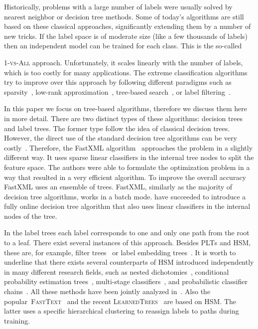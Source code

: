 \documentclass{article}
\newcommand{\Algo}[1]{\textsc{#1}}
\begin{document}
Historically, problems with a large number of labels were usually solved by nearest neighbor or decision tree methods. Some of today's algorithms are still based on these classical approaches, significantly extending them by a number of new tricks. If the label space is of moderate size (like a few thousands of labels) then an independent model can be trained for each class. This is the so-called {\Algo{1-vs-All} approach. Unfortunately, it scales linearly with the number of labels, which is too costly for many applications. The extreme classification algorithms try to improve over this  approach by following different paradigms such as sparsity~\citep{Yen_et_al_2017,Babbar_Scholkopf_2017}, low-rank approximation~\cite{Mineiro_Karampatziakis_2015,Yu_et_al_2014,Bhatia_et_al_2015}, tree-based search~\citep{Prabhu_Varma_2014,Choromanska_Langford_2015}, or label filtering~\citep{Vijayanarasimhan_et_al_2014,Shrivastava_Li_2015,Niculescu-Mizil_Abbasnejad_2017}.

In this paper we focus on tree-based algorithms, therefore we discuss them here in more detail. There are two distinct types of these algorithms: decision trees and label trees. The former type follow the idea of classical decision trees. However, the direct use of the standard decision tree algorithms can be very costly~\citep{Agrawal_et_al_2013}. Therefore, the FastXML algorithm~\citep{Prabhu_Varma_2014} approaches the problem in a slightly different way. It uses sparse linear classifiers in the internal tree nodes to split the feature space. The authors were able to formulate the optimization problem in a way that resulted in a very efficient algorithm. To improve the overall accuracy FastXML uses an ensemble of trees. FastXML, similarly as the majority of decision tree algorithms, works in a batch mode. \citet{Choromanska_Langford_2015} have succeeded to introduce a fully online decision tree algorithm that also uses linear classifiers in the internal nodes of the tree.

In the label trees each label corresponds to one and only one path from the root to a leaf. There exist several instances of this approach. Besides \Algo{PLT}s and \Algo{HSM}, these are, for example, filter trees~\citep{Beygelzimer_et_al_2009a,Li_Lin_2014} or label embedding trees~\citep{Bengio_et_al_2010}. It is worth to underline that there exists several counterparts of \Algo{HSM} introduced independently in many different research fields, such as nested dichotomies~\citep{Fox_1997}, conditional probability estimation trees~\citep{Beygelzimer_et_al_2009b}, multi-stage classifiers~\citep{Kurzynski_1988}, and probabilistic classifier chains~\citep{Dembczynski_et_al_2010c}. All these methods have been jointly analyzed in~\citep{Dembczynski_et_al_2016}.
Also the popular~\Algo{FastText}~\citep{Joulin_et_al_2016} and the recent \Algo{LearnedTrees}~\citep{Jernite_et_al_2017} are based on \Algo{HSM}. The latter uses a specific hierarchical clustering to reassign labels to paths during training. 

}
\end{document}
